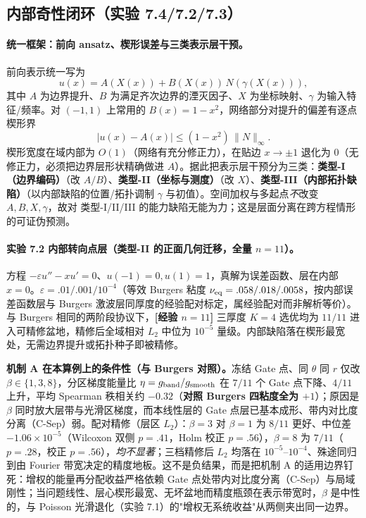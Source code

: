 \documentclass[fontset=windows,11pt]{ctexart}
\numberwithin{equation}{section}
\begin{document}
\subsection{内部奇性闭环（实验 7.4/7.2/7.3）}\label{sec:s2singular}

\paragraph{统一框架：前向 ansatz、楔形误差与三类表示层干预。}前向表示统一写为
\[
u(x)=A(X(x))+B(X(x))\,N(\gamma(X(x))),
\]
其中 $A$ 为边界提升、$B$ 为满足齐次边界的湮灭因子、$X$ 为坐标映射、$\gamma$ 为输入特征/频率。对 $(-1,1)$ 上常用的 $B(x)=1-x^2$，网络部分对提升的偏差有逐点楔形界
\begin{equation}\label{eq:wedge}
|u(x)-A(x)|\le (1-x^2)\,\|N\|_\infty .
\end{equation}
楔形宽度在域内部为 $O(1)$（网络有充分修正力），在贴边 $x\to\pm1$ 退化为 $0$（无修正力，必须把边界层形状精确做进 $A$）。据此把表示层干预分为三类：\textbf{类型-I（边界编码）}（改 $A/B$）、\textbf{类型-II（坐标与测度）}（改 $X$）、\textbf{类型-III（内部拓扑缺陷）}（以内部缺陷的位置/拓扑调制 $\gamma$ 与初值）。空间加权与多起点\emph{不}改变 $A,B,X,\gamma$，故对 类型-I/II/III 的能力缺陷无能为力；这是层面分离在跨方程情形的可证伪预测。

\paragraph{实验 7.2 内部转向点层（类型-II 的正面几何迁移，全量 $n=11$）。}方程 $-\varepsilon u''-xu'=0$、$u(-1)=0,u(1)=1$，真解为误差函数、层在内部 $x=0$。$\varepsilon=.01/.001/10^{-4}$（等效 Burgers 粘度 $\nu_{\rm eq}=.058/.018/.0058$，按内部误差函数层与 Burgers 激波层同厚度的经验配对标定，属经验配对而非解析等价）。与 Burgers 相同的两阶段协议下，\textbf{[经验 $n=11$]} 三厚度 $K=4$ 选优均为 $11/11$ 进入可精修盆地，精修后全域相对 $L_2$ 中位为 $10^{-5}$ 量级。内部缺陷落在楔形最宽处，无需边界提升或拓扑种子即被精修。

\noindent\textbf{机制 A 在本算例上的条件性（与 Burgers 对照）。}冻结 Gate 点、同 $\theta$ 同 $r$ 仅改 $\beta\in\{1,3,8\}$，分区梯度能量比 $\eta=g_{\rm band}/g_{\rm smooth}$ 在 $7/11$ 个 Gate 点下降、$4/11$ 上升，平均 Spearman 秩相关约 $-0.32$（\textbf{对照 Burgers 四粘度全为 $+1$}）；原因是 $\beta$ 同时放大层带与光滑区梯度，而本线性层的 Gate 点层已基本成形、带内对比度分离（C-Sep）弱。配对精修（层区 $L_2$）：$\beta=3$ 对 $\beta=1$ 为 $8/11$ 更好、中位差 $-1.06\times10^{-5}$（Wilcoxon 双侧 $p=.41$，Holm 校正 $p=.56$），$\beta=8$ 为 $7/11$（$p=.28$，校正 $p=.56$），\emph{均不显著}；三档精修后 $L_2$ 均落在 $10^{-5}$--$10^{-4}$、殊途同归到由 Fourier 带宽决定的精度地板。这不是负结果，而是把机制 A 的适用边界钉死：增权的能量再分配收益严格依赖 Gate 点处带内对比度分离（C-Sep）与局域刚性；当问题线性、层心楔形最宽、无坏盆地而精度瓶颈在表示带宽时，$\beta$ 是中性的，与 Poisson 光滑退化（实验 7.1）的"增权无系统收益"从两侧夹出同一边界。
\end{document}

